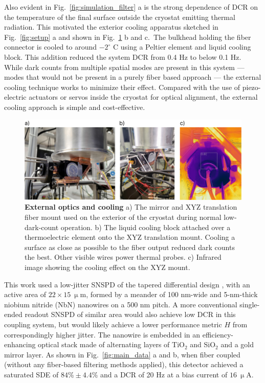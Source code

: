 \documentclass[11pt]{caltech_thesis} %
\begin{document}
Also evident in Fig.~\ref{fig:simulation_filter} a is the strong dependence of DCR on the temperature of the final surface outside the cryostat emitting thermal radiation. This motivated the exterior cooling apparatus sketched in Fig.~\ref{fig:setup} a and shown in Fig.~\ref{fig:cooling} b and c.~The bulkhead holding the fiber connector is cooled to around $-2^\circ$ C using a Peltier element and liquid cooling block. This addition reduced the system DCR from 0.4 Hz to below 0.1 Hz. While dark counts from multiple spatial modes are present in this system --- modes that would not be present in a purely fiber based approach --- the external cooling technique works to minimize their effect. Compared with the use of piezo-electric actuators or servos inside the cryostat for optical alignment, the external cooling approach is simple and cost-effective.

\hypertarget{fig:cooling}{%
\begin{figure}
\centering
\includegraphics[width=1\textwidth,height=\textheight]{./chapter_02/figs/exterior_optics_and_cooling_light.png}
\caption[{External optics and cooling}]{\textbf{External optics and cooling} a) The mirror and XYZ translation fiber mount used on the exterior of the cryostat during normal low-dark-count operation. b) The liquid cooling block attached over a thermoelectric element onto the XYZ translation mount. Cooling a surface as close as possible to the fiber output reduced dark counts the best. Other visible wires power thermal probes. c) Infrared image showing the cooling effect on the XYZ mount.}
\label{fig:cooling}
\end{figure}
}

This work used a low-jitter SNSPD of the tapered differential design \autocite{Colangelo2023}, with an active area of $22 \times 15 \ \mathrm{\upmu m}$, formed by a meander of 100 nm-wide and 5-nm-thick niobium nitride (NbN) nanowires on a 500 nm pitch. A more conventional single-ended readout SNSPD of similar area would also achieve low DCR in this coupling system, but would likely achieve a lower performance metric $H$ from correspondingly higher jitter. The nanowire is embedded in an efficiency-enhancing optical stack made of alternating layers of TiO$_2$ and SiO$_2$ and a gold mirror layer. As shown in Fig.~\ref{fig:main_data} a and b, when fiber coupled (without any fiber-based filtering methods applied), this detector achieved a saturated SDE of $84\% \pm 4.4 \%$ and a DCR of 20 Hz at a bias current of $16\ \mathrm{\upmu A}$.
\end{document}
